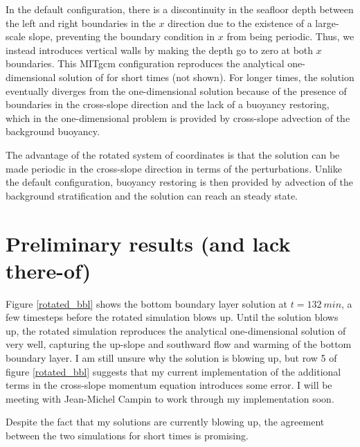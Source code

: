 \documentclass{article}
\begin{document}
In the default configuration, there is a discontinuity in the seafloor depth between the left and right boundaries in the $x$ direction due to the existence of a large-scale slope, preventing the boundary condition in $x$ from being periodic. Thus, we instead introduces vertical walls by making the depth go to zero at both $x$ boundaries. This MITgcm configuration reproduces the analytical one-dimensional solution of \cite{Garrett1990TheMixing} for short times (not shown). For longer times, the solution eventually diverges from the one-dimensional solution because of the presence of boundaries in the cross-slope direction and the lack of a buoyancy restoring, which in the one-dimensional problem is provided by cross-slope advection of the background buoyancy.

The advantage of the rotated system of coordinates is that the solution can be made periodic in the cross-slope direction in terms of the perturbations. Unlike the default configuration, buoyancy restoring is then provided by advection of the background stratification and the solution can reach an steady state.

\section{Preliminary results (and lack there-of)}

Figure \ref{rotated_bbl} shows the bottom boundary layer solution at $t = \SI{132}{min}$, a few timesteps before the rotated simulation blows up. Until the solution blows up, the rotated simulation reproduces the analytical one-dimensional solution of \cite{Garrett1990TheMixing} very well, capturing the up-slope and southward flow and warming of the bottom boundary layer. I am still unsure why the solution is blowing up, but row 5 of figure \ref{rotated_bbl} suggests that my current implementation of the additional terms in the cross-slope momentum equation introduces some error. I will be meeting with Jean-Michel Campin to work through my implementation soon.

Despite the fact that my solutions are currently blowing up, the agreement between the two simulations for short times is promising.
\end{document}
